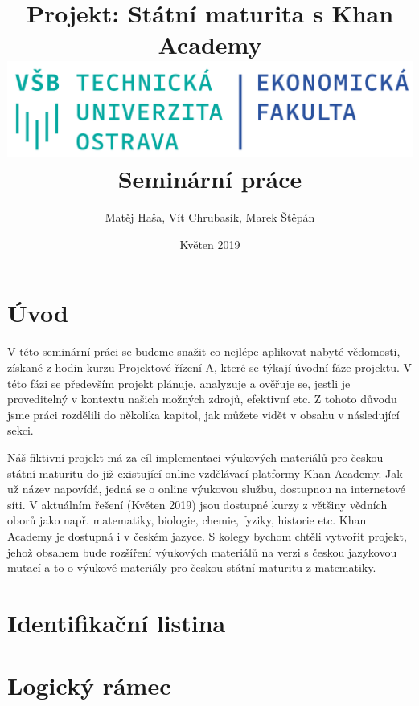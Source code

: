 \documentclass[12pt, a4paper]{report}
\author{Matěj Haša, Vít Chrubasík, Marek Štěpán}
\date{Květen 2019}
\title{Projekt: Státní maturita s Khan Academy\\\medskip
\large \includegraphics[width=\linewidth]{./images/skola_logo.png} Seminární práce}
\begin{document}
\maketitle
\tableofcontents
\thispagestyle{empty}



\chapter{Úvod}
\label{sec:org7a1d734}
V této seminární práci se budeme snažit co nejlépe aplikovat nabyté vědomosti, získané z hodin kurzu Projektové řízení A, které se týkají úvodní fáze projektu. V této fázi se především projekt plánuje, analyzuje a ověřuje se, jestli je proveditelný v kontextu našich možných zdrojů, efektivní etc. Z tohoto důvodu jsme práci rozdělili do několika kapitol, jak můžete vidět v obsahu v následující sekci. 

Náš fiktivní projekt má za cíl implementaci výukových materiálů pro českou státní maturitu do již existující online vzdělávací platformy Khan Academy. Jak už název napovídá, jedná se o online výukovou službu, dostupnou na internetové síti. V aktuálním řešení (Květen 2019) jsou dostupné kurzy z většiny vědních oborů jako např. matematiky, biologie, chemie, fyziky, historie etc. Khan Academy je dostupná i v českém jazyce. S kolegy bychom chtěli vytvořit projekt, jehož obsahem bude rozšíření výukových materiálů na verzi s českou jazykovou mutací a to o výukové materiály pro českou státní maturitu z matematiky.
\chapter{Identifikační listina}
\label{sec:org2fe0249}
\chapter{Logický rámec}
\label{sec:orgd1ecb1c}
\end{document}
